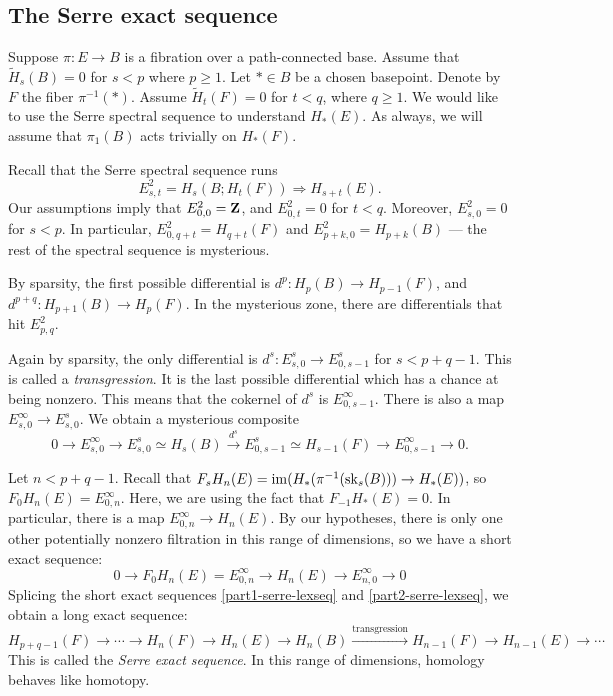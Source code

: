 \subsection{The Serre exact sequence}
Suppose $\pi:E\to B$ is a fibration over a path-connected base. Assume that
$\widetilde{H}_s(B) = 0$ for $s<p$ where $p\geq 1$. Let $\ast\in B$ be a chosen
basepoint. Denote by $F$ the fiber $\pi^{-1}(\ast)$. Assume $\widetilde{H}_t(F)
= 0$ for $t<q$, where $q\geq 1$.  We would like to use the Serre spectral
sequence to understand $H_\ast(E)$. As always, we will assume that $\pi_1(B)$
acts trivially on $H_\ast(F)$. 

Recall that the Serre spectral sequence runs
$$
E^2_{s,t} = H_s(B;H_t(F)) \Rightarrow H_{s+t}(E).
$$
Our assumptions imply that $E^2_{0,0}=\mathbf Z$, and $E^2_{0,t} = 0$ for $t<q$.
Moreover, $E^2_{s,0} = 0$ for $s<p$. In particular, $E^2_{0,q+t} = H_{q+t}(F)$
and $E^2_{p+k,0} = H_{p+k}(B)$ --- the rest of the spectral sequence is
mysterious.

By sparsity, the first possible differential is $d^{p}:H_p(B) \to H_{p-1}(F)$, and
$d^{p+q}:H_{p+1}(B)\to H_{p}(F)$. In the mysterious zone, there are
differentials that hit $E^2_{p,q}$.

Again by sparsity, the only differential is $d^s:E^s_{s,0}\to E^s_{0,s-1}$ for
$s<p+q-1$. This is called a \emph{transgression}. It is the last possible
differential which has a chance at being nonzero. This means that the cokernel
of $d^s$ is $E^\infty_{0,s-1}$. There is also a map $E^\infty_{s,0}\to
E^s_{s,0}$. We obtain a mysterious composite 
\begin{equation}\label{part1-serre-lexseq}
    0\to E^\infty_{s,0}\to E^s_{s,0} \simeq H_s(B) \xrightarrow{d^s}
    E^s_{0,s-1}\simeq H_{s-1}(F) \to E^\infty_{0,s-1}\to 0.
\end{equation}

Let $n<p+q-1$. Recall that $F_s H_n(E) =
\operatorname{im}(H_\ast(\pi^{-1}(\mathrm{sk}_s(B)))\to H_\ast(E))$, so $F_0 H_n(E) =
E^\infty_{0,n}$. Here, we are using the fact that $F_{-1} H_\ast(E) = 0$. In
particular, there is a map $E^\infty_{0,n}\to H_n(E)$. By our hypotheses, there
is only one other potentially nonzero filtration in this range of dimensions,
so we have a short exact sequence:
\begin{equation}\label{part2-serre-lexseq}
    0\to F_0 H_n(E) = E^\infty_{0,n} \to H_n(E) \to E^\infty_{n,0} \to 0
\end{equation}
Splicing the short exact sequences \eqref{part1-serre-lexseq} and
\eqref{part2-serre-lexseq}, we obtain a long exact sequence:
$$
H_{p+q-1}(F)\to \cdots\to H_n(F)\to H_n(E)\to H_n(B) \xrightarrow{\text{transgression}} H_{n-1}(F) \to H_{n-1}(E)\to \cdots
$$
This is called the \emph{Serre exact sequence}. In this range of dimensions,
homology behaves like homotopy.
